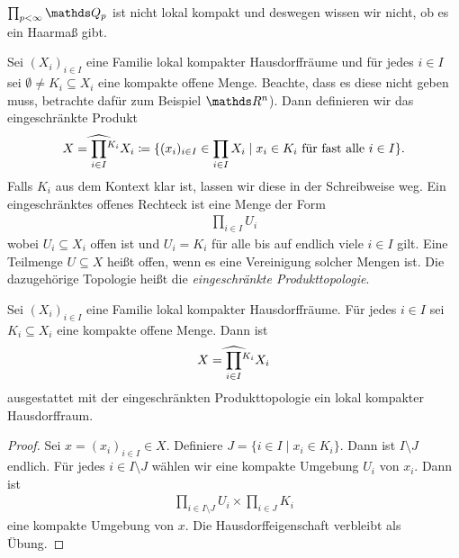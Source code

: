 \begin{bsp}
$\prod_{p <\infty} \Q_p$ ist nicht lokal kompakt und deswegen wissen wir nicht, ob es ein Haarmaß gibt.
\end{bsp}

\begin{defi}
Sei $(X_i)_{ i \in I}$ eine Familie lokal kompakter Hausdorffräume und für jedes $i \in I$ sei $\emptyset \not =K_i\subseteq X_i$ eine kompakte offene Menge. Beachte, dass es diese nicht geben muss,
betrachte dafür zum Beispiel $\Rn$).
Dann definieren wir das eingeschränkte Produkt
\begin{align*}
X=\widehat{\prod_{i \in I}}\vphantom{\prod}^{K_i} X_i \coloneqq \{(x_i)_{i \in I} \in \prod_{i \in I} X_i \mid x_i \in K_i \text{ für fast alle } i \in I\}.
\end{align*}
Falls $K_i$ aus dem Kontext klar ist, lassen wir diese in der Schreibweise weg.
Ein eingeschränktes offenes Rechteck ist eine Menge der Form
\begin{align*}
\prod_{i\in I} U_i
\end{align*}
wobei $U_i \subseteq X_i$ offen ist und $U_i=K_i$ für alle bis auf endlich viele $i  \in I$ gilt.
Eine Teilmenge $U\subseteq X$ heißt offen, wenn es eine Vereinigung solcher Mengen ist.
Die dazugehörige Topologie heißt die \emph{eingeschränkte Produkttopologie}.
\end{defi}

\begin{prop}
Sei $(X_i)_{i\in I}$ eine Familie lokal kompakter Hausdorffräume.
Für jedes $i \in I$ sei $K_i\subseteq X_i$ eine kompakte offene Menge.
Dann ist
\begin{align*}
X=\widehat{\prod_{i \in I}}\vphantom{\prod}^{K_i} X_i
\end{align*}
ausgestattet mit der eingeschränkten Produkttopologie ein lokal kompakter Hausdorffraum.
\end{prop}

\begin{proof}
Sei $x=(x_i)_{i \in I} \in X$. Definiere $J=\{i \in I \mid x_i \in K_i\}$. Dann ist $I\setminus J$ endlich. Für jedes $i \in I\setminus J$ wählen wir eine kompakte Umgebung $U_i$ von $x_i$.
Dann ist
\begin{align*}
\prod_{i\in I\setminus J} U_i \times \prod_{i\in J} K_i
\end{align*}
eine kompakte Umgebung von $x$.
Die Hausdorffeigenschaft verbleibt als Übung.
\end{proof}

